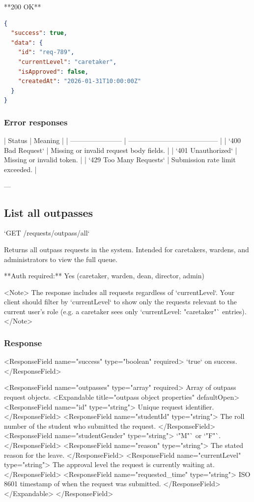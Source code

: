 **200 OK**

\begin{lstlisting}[language=json]
{
  "success": true,
  "data": {
    "id": "req-789",
    "currentLevel": "caretaker",
    "isApproved": false,
    "createdAt": "2026-01-31T10:00:00Z"
  }
}

\end{lstlisting}

\subsubsection{Error responses}

| Status                  | Meaning                                 |
| ----------------------- | --------------------------------------- |
| `400 Bad Request`       | Missing or invalid request body fields. |
| `401 Unauthorized`      | Missing or invalid token.               |
| `429 Too Many Requests` | Submission rate limit exceeded.         |

---

\subsection{List all outpasses}

`GET /requests/outpass/all`

Returns all outpass requests in the system. Intended for caretakers, wardens, and administrators to view the full queue.

**Auth required:** Yes (caretaker, warden, dean, director, admin)

<Note>
  The response includes all requests regardless of `currentLevel`. Your client
  should filter by `currentLevel` to show only the requests relevant to the
  current user's role (e.g. a caretaker sees only `currentLevel: "caretaker"`
  entries).
</Note>

\subsubsection{Response}

<ResponseField name="success" type="boolean" required>
  `true` on success.
</ResponseField>

<ResponseField name="outpasses" type="array" required>
  Array of outpass request objects.
  <Expandable title="outpass object properties" defaultOpen>
    <ResponseField name="id" type="string">
      Unique request identifier.
    </ResponseField>
    <ResponseField name="studentId" type="string">
      The roll number of the student who submitted the request.
    </ResponseField>
    <ResponseField name="studentGender" type="string">
      `"M"` or `"F"`.
    </ResponseField>
    <ResponseField name="reason" type="string">
      The stated reason for the leave.
    </ResponseField>
    <ResponseField name="currentLevel" type="string">
      The approval level the request is currently waiting at.
    </ResponseField>
    <ResponseField name="requested_time" type="string">
      ISO 8601 timestamp of when the request was submitted.
    </ResponseField>
  </Expandable>
</ResponseField>

